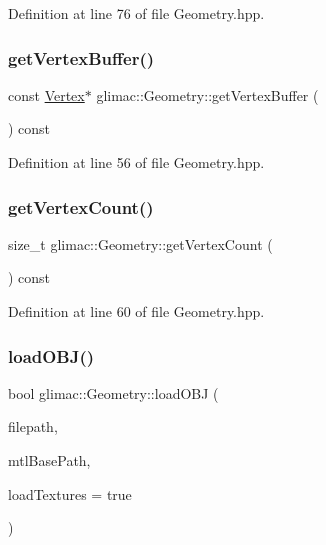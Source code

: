Definition at line 76 of file Geometry.\+hpp.

\mbox{\label{classglimac_1_1_geometry_add889566d1d4d2fea740d84cf5e3c18f}} 
\subsubsection{\texorpdfstring{get\+Vertex\+Buffer()}{getVertexBuffer()}}
{\footnotesize\ttfamily const \hyperlink{structglimac_1_1_geometry_1_1_vertex}{Vertex}$\ast$ glimac\+::\+Geometry\+::get\+Vertex\+Buffer (\begin{DoxyParamCaption}{ }\end{DoxyParamCaption}) const\hspace{0.3cm}{\ttfamily [inline]}}



Definition at line 56 of file Geometry.\+hpp.

\mbox{\label{classglimac_1_1_geometry_adf2d769d9b6195c2ab88f6dfe6abd8d9}} 
\subsubsection{\texorpdfstring{get\+Vertex\+Count()}{getVertexCount()}}
{\footnotesize\ttfamily size\+\_\+t glimac\+::\+Geometry\+::get\+Vertex\+Count (\begin{DoxyParamCaption}{ }\end{DoxyParamCaption}) const\hspace{0.3cm}{\ttfamily [inline]}}



Definition at line 60 of file Geometry.\+hpp.

\mbox{\label{classglimac_1_1_geometry_af796a2bd4c60c32de47b3bcb53bb3cef}} 
\subsubsection{\texorpdfstring{load\+O\+B\+J()}{loadOBJ()}}
{\footnotesize\ttfamily bool glimac\+::\+Geometry\+::load\+O\+BJ (\begin{DoxyParamCaption}\item[{const \hyperlink{classglimac_1_1_file_path}{File\+Path} \&}]{filepath,  }\item[{const \hyperlink{classglimac_1_1_file_path}{File\+Path} \&}]{mtl\+Base\+Path,  }\item[{bool}]{load\+Textures = {\ttfamily true} }\end{DoxyParamCaption})}




